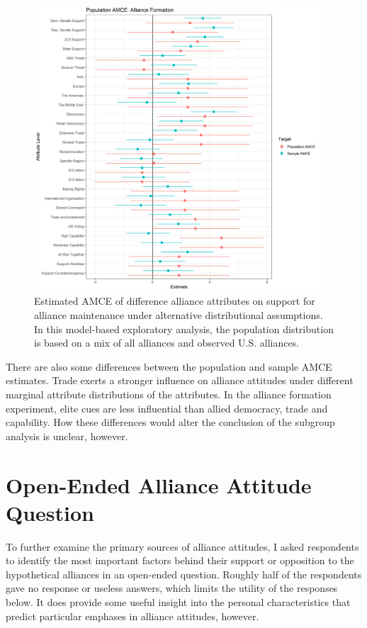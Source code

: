 \documentclass[12pt]{article}
\begin{document}
\begin{figure}
	\centering
		\includegraphics[width=0.95\textwidth]{pop-amce-form.png}
	\caption{Estimated AMCE of difference alliance attributes on support for alliance maintenance under alternative distributional assumptions. In this model-based exploratory analysis, the population distribution is based on a mix of all alliances and observed U.S. alliances.}
	\label{fig:pop-amce-form}
\end{figure}

There are also some differences between the population and sample AMCE estimates. 
Trade exerts a stronger influence on alliance attitudes under different marginal attribute distributions of the attributes. 
In the alliance formation experiment, elite cues are less influential than allied democracy, trade and capability. 
How these differences would alter the conclusion of the subgroup analysis is unclear, however. 


\newpage


\section{Open-Ended Alliance Attitude Question} 


To further examine the primary sources of alliance attitudes, I asked respondents to identify the most important factors behind their support or opposition to the hypothetical alliances in an open-ended question. 
Roughly half of the respondents gave no response or useless answers, which limits the utility of the responses below. 
It does provide some useful insight into the personal characteristics that predict particular emphases in alliance attitudes, however. 
\end{document}

